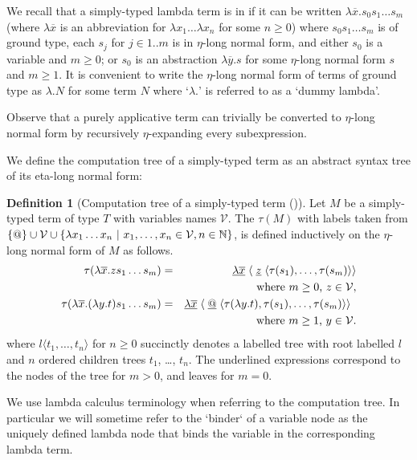 \documentclass[a4paper]{article}[12pt]
\theoremstyle{remark}
\theoremstyle{definition}
\newtheorem{definition}{Definition}[section]
\begin{document}
We recall that a simply-typed lambda term is in  if it can be written $\lambda \overline{x} . s_0 s_1 \ldots s_m$ (where $\lambda \overline{x}$ is an abbreviation for $\lambda x_1 \ldots \lambda x_n$ for some $n\geq 0$) where $s_0 s_1 \ldots s_m$ is of ground type, each $s_j$ for $j\in 1..m$ is in $\eta$-long normal form, and either $s_0$ is a variable and $m\geq0$; or $s_0$ is an abstraction $\lambda\overline{y}.s$ for some $\eta$-long normal form $s$ and $m\geq1$.
It is convenient to write the $\eta$-long normal form of terms of ground type as $\lambda . N$ for some term $N$ where `$\lambda.$' is referred to as a `dummy lambda'.

Observe that a purely applicative term can trivially be converted to $\eta$-long normal form by recursively $\eta$-expanding every subexpression.

We define the computation tree of a simply-typed term as an abstract syntax tree of its eta-long normal form:
\begin{definition}[Computation tree of a simply-typed term (\cite{BlumPhd})]
	Let $M$ be a simply-typed term of type $T$ with variables names $\mathcal{V}$.
	The  $\tau(M)$ with labels taken from $ \{ @ \} \cup \mathcal{V} \cup \{ \lambda x_1 \ldots x_n \ | \ x_1 ,\ldots, x_n \in
	\mathcal{V}, n\in\mathbb{N} \}$, is defined inductively on the $\eta$-long normal form of $M$ as follows.
	\begin{eqnarray*}
		\tau(\lambda \overline{x} . z s_1 \ldots s_m) &=& \underline{\lambda \overline{x}}\; \langle\; \underline z\; \langle\tau(s_1),\ldots,\tau(s_m)\rangle\rangle\\
		&& \hbox {where $m\geq 0$, $z \in \mathcal{V}$}, \\
 \tau(\lambda \overline{x} . (\lambda y.t) s_1 \ldots s_m) &=& \underline{\lambda \overline{x}}\; \langle\; \underline @ \; \langle \tau(\lambda y.t),\tau(s_1),\ldots,\tau(s_m) \rangle \rangle \enspace\\
&&  \hbox{where $m\geq 1$, $y\in \mathcal{V}$}.
	\end{eqnarray*}
	where $l\langle t_1, \ldots, t_n \rangle$ for $n \geq 0$ succinctly denotes a labelled tree with root labelled $l$ and $n$ ordered children trees $t_1$, \ldots, $t_n$. The underlined expressions correspond to the nodes of the tree for $m>0$, and leaves for $m=0$.
\end{definition}

We use lambda calculus terminology when referring to the computation tree. In particular we will sometime refer to the `binder` of a variable node as the uniquely defined lambda node that binds the variable in the corresponding lambda term.
\end{document}
